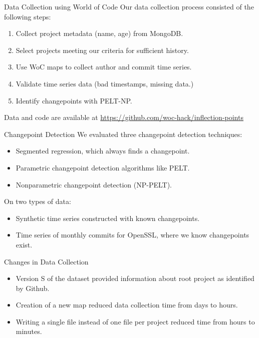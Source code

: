 \documentclass[11pt,handout]{beamer}
\begin{document}
\begin{frame}{Data Collection using World of Code}
    Our data collection process consisted of the following steps:
    \begin{enumerate}
        \item Collect project metadata (name, age) from MongoDB.
        \item Select projects meeting our criteria for sufficient history.
        \item Use WoC maps to collect author and commit time series.
        \item Validate time series data (bad timestamps, missing data.)
        \item Identify changepoints with PELT-NP.
    \end{enumerate}
    \vskip 5mm
    Data and code are available at \url{https://github.com/woc-hack/inflection-points}
\end{frame}

\begin{frame}{Changepoint Detection}
We evaluated three changepoint detection techniques:
    \begin{itemize}
        \item Segmented regression, which always finds a changepoint.
        \item Parametric changepoint detection algorithms like PELT.
        \item Nonparametric changepoint detection (NP-PELT).
    \end{itemize}
On two types of data:
    \begin{itemize}
        \item Synthetic time series constructed with known changepoints.
        \item Time series of monthly commits for OpenSSL, where we know changepoints exist.
    \end{itemize}
\end{frame}

\begin{frame}{Changes in Data Collection}
    \begin{itemize}
        \item Version S of the dataset provided information about root project as identified by Github.
        \item Creation of a new map reduced data collection time from days to hours.
        \item Writing a single file instead of one file per project reduced time from hours to minutes.
    \end{itemize}
\end{frame}
\end{document}
